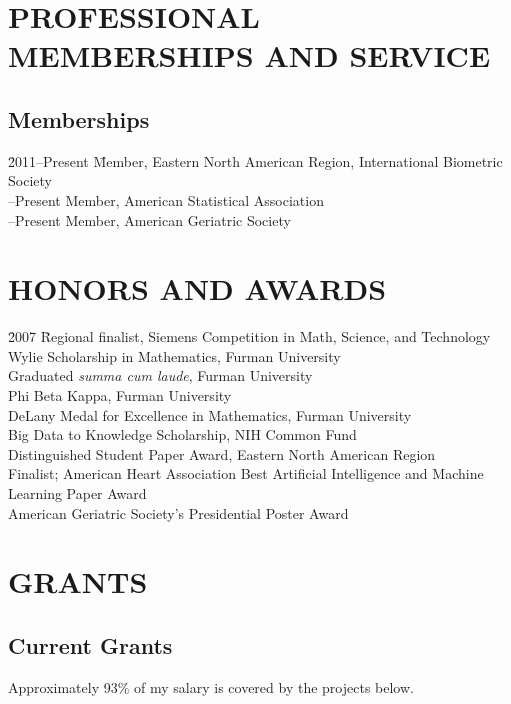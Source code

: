 \documentclass[11pt]{cv_wakeforest_article}
\newcommand{\AR}[1]{#1}  %
\newcommand{\mysection}[1]{\section*{#1}}
\newcommand{\mysubsection}[1]{\subsection*{#1}}
\begin{document}
\mysection{PROFESSIONAL MEMBERSHIPS AND SERVICE}

\mysubsection{Memberships}

\begin{tabbing}
\hspace{0.25in} \= 2011--Present \hspace{0.25in} \=  Member, Eastern North American Region, International Biometric Society\\
--Present \> Member, American Statistical Association\\
--Present \> \AR{Member, American Geriatric Society}\\
\end{tabbing}

\mysection{HONORS AND AWARDS}
\begin{tabbing}
\hspace{0.25in} \= 2007\phantom{--Present} \hspace{0.25in} \= Regional finalist, Siemens Competition in Math, Science, and Technology \\
\> Wylie Scholarship in Mathematics, Furman University\\
\> Graduated \emph{summa cum laude}, Furman University\\
\> Phi Beta Kappa, Furman University\\
\> DeLany Medal for Excellence in Mathematics, Furman University\\
\> Big Data to Knowledge Scholarship, NIH Common Fund\\
\> Distinguished Student Paper Award, Eastern North American Region\\
\> Finalist; American Heart Association Best Artificial Intelligence and Machine\\\>\>\hspace{0.25in}Learning Paper Award \\
\> \AR{American Geriatric Society's Presidential Poster Award}
\end{tabbing}

\mysection{GRANTS}

\mysubsection{Current Grants}

Approximately 93\% of my salary is covered by the projects below. 
\end{document}
